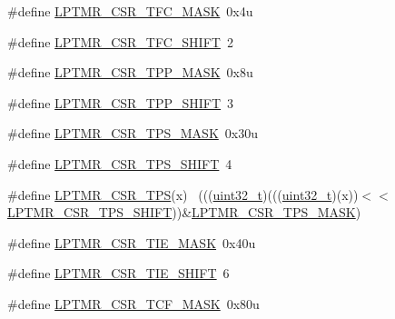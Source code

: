 \begin{DoxyCompactItemize}
\item 
\#define \hyperlink{group___l_p_t_m_r___register___masks_gaca581598c0f319b0002deda730479842}{L\+P\+T\+M\+R\+\_\+\+C\+S\+R\+\_\+\+T\+F\+C\+\_\+\+M\+A\+SK}~0x4u
\item 
\#define \hyperlink{group___l_p_t_m_r___register___masks_gaee3d1b59f30f6217f1f74b18cf973c4a}{L\+P\+T\+M\+R\+\_\+\+C\+S\+R\+\_\+\+T\+F\+C\+\_\+\+S\+H\+I\+FT}~2
\item 
\#define \hyperlink{group___l_p_t_m_r___register___masks_ga020eee1550f2943c10d51f8b56930e62}{L\+P\+T\+M\+R\+\_\+\+C\+S\+R\+\_\+\+T\+P\+P\+\_\+\+M\+A\+SK}~0x8u
\item 
\#define \hyperlink{group___l_p_t_m_r___register___masks_ga62be70d70bd4e88e26e5cc8437f6fd55}{L\+P\+T\+M\+R\+\_\+\+C\+S\+R\+\_\+\+T\+P\+P\+\_\+\+S\+H\+I\+FT}~3
\item 
\#define \hyperlink{group___l_p_t_m_r___register___masks_ga3502ccff1cbdb70bb99b73c035ab1e19}{L\+P\+T\+M\+R\+\_\+\+C\+S\+R\+\_\+\+T\+P\+S\+\_\+\+M\+A\+SK}~0x30u
\item 
\#define \hyperlink{group___l_p_t_m_r___register___masks_ga7759d842742bfedd91788d41ef12fb8d}{L\+P\+T\+M\+R\+\_\+\+C\+S\+R\+\_\+\+T\+P\+S\+\_\+\+S\+H\+I\+FT}~4
\item 
\#define \hyperlink{group___l_p_t_m_r___register___masks_gac9a5296718b4ce691d3ea7be07b20a79}{L\+P\+T\+M\+R\+\_\+\+C\+S\+R\+\_\+\+T\+PS}(x)                                              ~(((\hyperlink{_p_e___types_8h_a33594304e786b158f3fb30289278f5af}{uint32\+\_\+t})(((\hyperlink{_p_e___types_8h_a33594304e786b158f3fb30289278f5af}{uint32\+\_\+t})(x))$<$$<$\hyperlink{group___l_p_t_m_r___register___masks_ga7759d842742bfedd91788d41ef12fb8d}{L\+P\+T\+M\+R\+\_\+\+C\+S\+R\+\_\+\+T\+P\+S\+\_\+\+S\+H\+I\+FT}))\&\hyperlink{group___l_p_t_m_r___register___masks_ga3502ccff1cbdb70bb99b73c035ab1e19}{L\+P\+T\+M\+R\+\_\+\+C\+S\+R\+\_\+\+T\+P\+S\+\_\+\+M\+A\+SK})
\item 
\#define \hyperlink{group___l_p_t_m_r___register___masks_gabb726cb43d5f6ee38339048c69a5f086}{L\+P\+T\+M\+R\+\_\+\+C\+S\+R\+\_\+\+T\+I\+E\+\_\+\+M\+A\+SK}~0x40u
\item 
\#define \hyperlink{group___l_p_t_m_r___register___masks_gaaedba0195b3abfcae6e8669f84f39d5d}{L\+P\+T\+M\+R\+\_\+\+C\+S\+R\+\_\+\+T\+I\+E\+\_\+\+S\+H\+I\+FT}~6
\item 
\#define \hyperlink{group___l_p_t_m_r___register___masks_ga13b5dd6085ca2a8cf0f06550b7557b6b}{L\+P\+T\+M\+R\+\_\+\+C\+S\+R\+\_\+\+T\+C\+F\+\_\+\+M\+A\+SK}~0x80u
\item 
$$
\end{DoxyCompactItemize}
